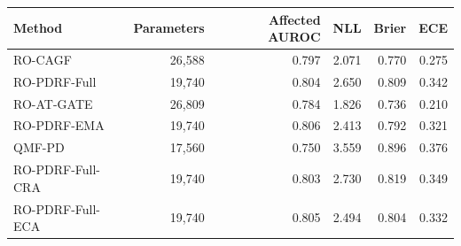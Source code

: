 \begin{tabular}{lrrrrr}
\toprule
Method & Parameters & Affected AUROC & NLL & Brier & ECE \\
\midrule
RO-CAGF & 26,588 & 0.797 & 2.071 & 0.770 & 0.275 \\
RO-PDRF-Full & 19,740 & 0.804 & 2.650 & 0.809 & 0.342 \\
RO-AT-GATE & 26,809 & 0.784 & 1.826 & 0.736 & 0.210 \\
RO-PDRF-EMA & 19,740 & 0.806 & 2.413 & 0.792 & 0.321 \\
QMF-PD & 17,560 & 0.750 & 3.559 & 0.896 & 0.376 \\
RO-PDRF-Full-CRA & 19,740 & 0.803 & 2.730 & 0.819 & 0.349 \\
RO-PDRF-Full-ECA & 19,740 & 0.805 & 2.494 & 0.804 & 0.332 \\
\bottomrule
\end{tabular}